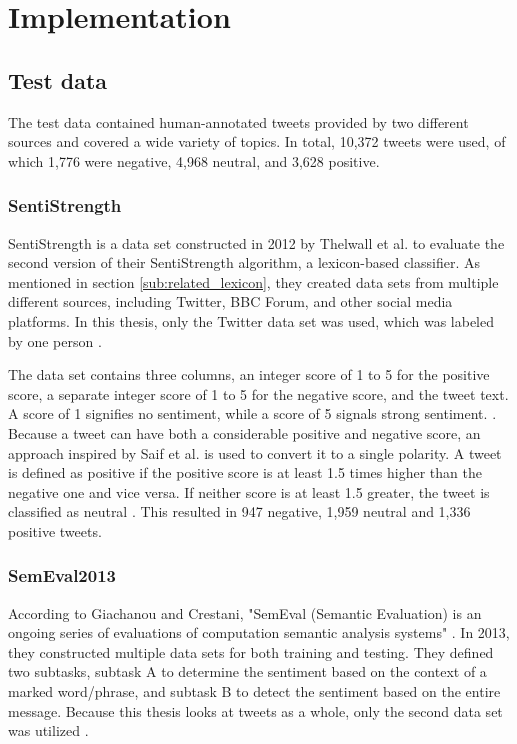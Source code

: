 \chapter{Implementation}
\label{cha:Chapter5_Implementation}
\section{Test data}
The test data contained human-annotated tweets provided by two different sources and covered a wide variety of topics. In total, 10,372 tweets were used, of which 1,776 were negative, 4,968 neutral, and 3,628 positive.

\subsection{SentiStrength}
SentiStrength is a data set constructed in 2012 by Thelwall et al. to evaluate the second version of their SentiStrength algorithm, a lexicon-based classifier. As mentioned in section \ref{sub:related_lexicon}, they created data sets from multiple different sources, including Twitter, BBC Forum, and other social media platforms. In this thesis, only the Twitter data set was used, which was labeled by one person \cite{10.1002/asi.21662}.

The data set contains three columns, an integer score of 1 to 5 for the positive score, a separate integer score of 1 to 5 for the negative score, and the tweet text. A score of 1 signifies no sentiment, while a score of 5 signals strong sentiment. \cite{10.1002/asi.21662}. Because a tweet can have both a considerable positive and negative score, an approach inspired by Saif et al. is used to convert it to a single polarity. A tweet is defined as positive if the positive score is at least 1.5 times higher than the negative one and vice versa. If neither score is at least 1.5 greater, the tweet is classified as neutral \cite{oro40660}. This resulted in 947 negative, 1,959 neutral and 1,336 positive tweets.

\subsection{SemEval2013}
According to Giachanou and Crestani, "SemEval (Semantic Evaluation) is an ongoing series of evaluations of computation semantic analysis systems" \cite[p.~28:31]{DBLP:journals/csur/GiachanouC16}. In 2013, they constructed multiple data sets for both training and testing. They defined two subtasks, subtask A to determine the sentiment based on the context of a marked word/phrase, and subtask B to detect the sentiment based on the entire message. Because this thesis looks at tweets as a whole, only the second data set was utilized \cite{nakov-etal-2013-semeval}.

